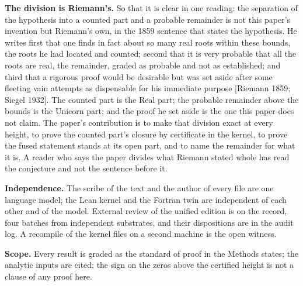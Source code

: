 \documentclass[10pt,twocolumn]{article}
\begin{document}
\textbf{The division is Riemann's.} So that it is clear in one reading:
the separation of the hypothesis into a counted part and a probable
remainder is not this paper's invention but Riemann's own, in the 1859
sentence that states the hypothesis. He writes first that one finds in
fact about so many real roots within these bounds, the roots he had
located and counted; second that it is very probable that all the roots
are real, the remainder, graded as probable and not as established; and
third that a rigorous proof would be desirable but was set aside after
some fleeting vain attempts as dispensable for his immediate purpose
{[}Riemann 1859; Siegel 1932{]}. The counted part is the Real part; the
probable remainder above the bounds is the Unicorn part; and the proof
he set aside is the one this paper does not claim. The paper's
contribution is to make that division exact at every height, to prove
the counted part's closure by certificate in the kernel, to prove the
fused statement stands at its open part, and to name the remainder for
what it is. A reader who says the paper divides what Riemann stated
whole has read the conjecture and not the sentence before it.

\textbf{Independence.} The scribe of the text and the author of every
file are one language model; the Lean kernel and the Fortran twin are
independent of each other and of the model. External review of the
unified edition is on the record, four batches from independent
substrates, and their dispositions are in the audit log. A recompile of
the kernel files on a second machine is the open witness.

\textbf{Scope.} Every result is graded as the standard of proof in the
Methods states; the analytic inputs are cited; the sign on the zeros
above the certified height is not a clause of any proof here.
\end{document}
